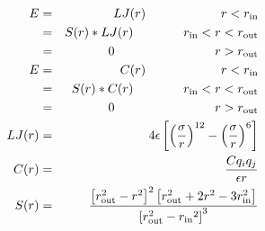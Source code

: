 \documentclass[12pt]{article}
\begin{document}
\begin{eqnarray*}
 E & = & LJ(r) \qquad \qquad \qquad r < r_{\rm in} \\
   & = & S(r) * LJ(r) \qquad \qquad r_{\rm in} < r < r_{\rm out} \\
   & = & 0 \qquad \qquad \qquad \qquad r > r_{\rm out} \\
 E & = & C(r) \qquad \qquad \qquad r < r_{\rm in} \\
   & = & S(r) * C(r) \qquad \qquad r_{\rm in} < r < r_{\rm out} \\
   & = & 0 \qquad \qquad \qquad \qquad r > r_{\rm out} \\
 LJ(r) & = & 4 \epsilon \left[ \left(\frac{\sigma}{r}\right)^{12} - 
         \left(\frac{\sigma}{r}\right)^6 \right] \\
 C(r) & = & \frac{C q_i q_j}{ \epsilon r} \\
 S(r) & = & \frac{ \left[r_{\rm out}^2 - r^2\right]^2  
   \left[r_{\rm out}^2 + 2r^2 - 3{r_{\rm in}^2}\right]} 
 { \left[r_{\rm out}^2 - {r_{\rm in}}^2\right]^3 }
\end{eqnarray*}                           
\end{document}
